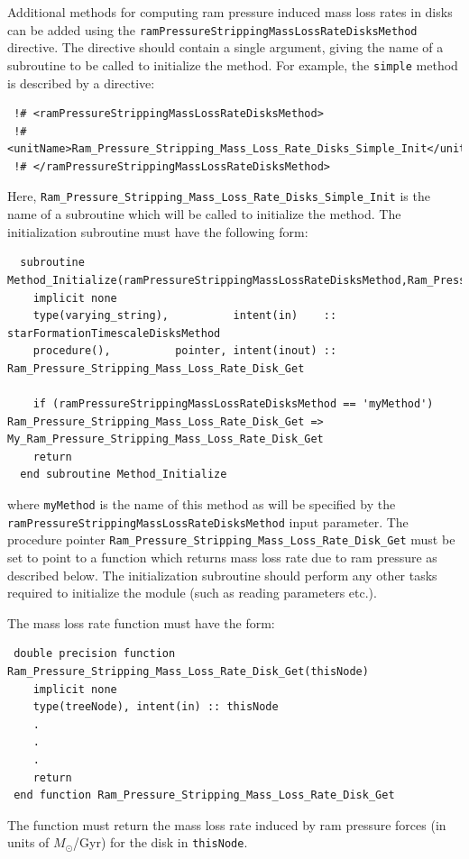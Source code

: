 Additional methods for computing ram pressure induced mass loss rates in disks can be added using the {\tt ramPressureStrippingMassLossRateDisksMethod} directive. The directive should contain a single argument, giving the name of a subroutine to be called to initialize the method. For example, the {\tt simple} method is described by a directive:
\begin{verbatim}
 !# <ramPressureStrippingMassLossRateDisksMethod>
 !#  <unitName>Ram_Pressure_Stripping_Mass_Loss_Rate_Disks_Simple_Init</unitName>
 !# </ramPressureStrippingMassLossRateDisksMethod>
\end{verbatim}
Here, {\tt Ram\_Pressure\_Stripping\_Mass\_Loss\_Rate\_Disks\_Simple\_Init} is the name of a subroutine which will be called to initialize the method. The initialization subroutine must have the following form:
\begin{verbatim}
  subroutine Method_Initialize(ramPressureStrippingMassLossRateDisksMethod,Ram_Pressure_Stripping_Mass_Loss_Rate_Disk_Get)
    implicit none
    type(varying_string),          intent(in)    :: starFormationTimescaleDisksMethod
    procedure(),          pointer, intent(inout) :: Ram_Pressure_Stripping_Mass_Loss_Rate_Disk_Get
    
    if (ramPressureStrippingMassLossRateDisksMethod == 'myMethod') Ram_Pressure_Stripping_Mass_Loss_Rate_Disk_Get => My_Ram_Pressure_Stripping_Mass_Loss_Rate_Disk_Get
    return
  end subroutine Method_Initialize
\end{verbatim}
where {\tt myMethod} is the name of this method as will be specified by the {\tt ramPressureStrippingMassLossRateDisksMethod} input parameter. The procedure pointer {\tt Ram\_Pressure\_Stripping\_Mass\_Loss\_Rate\_Disk\_Get} must be set to point to a function which returns mass loss rate due to ram pressure as described below. The initialization subroutine should perform any other tasks required to initialize the module (such as reading parameters etc.).

The mass loss rate function must have the form:
\begin{verbatim}
 double precision function Ram_Pressure_Stripping_Mass_Loss_Rate_Disk_Get(thisNode)
    implicit none
    type(treeNode), intent(in) :: thisNode
    .
    .
    .
    return
 end function Ram_Pressure_Stripping_Mass_Loss_Rate_Disk_Get
\end{verbatim}
The function must return the mass loss rate induced by ram pressure forces (in units of $M_\odot$/Gyr) for the disk in {\tt thisNode}.


